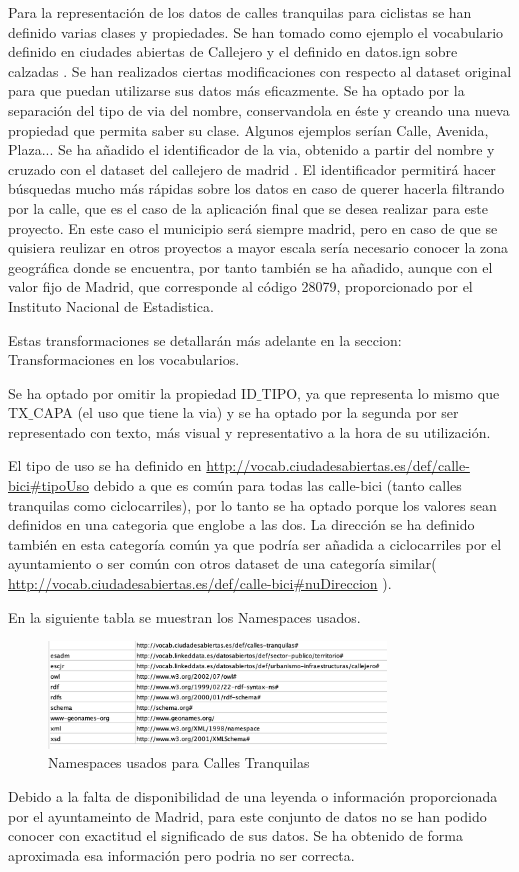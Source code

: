 Para la representación de los datos de calles tranquilas para ciclistas se han definido varias clases y propiedades. Se han tomado como ejemplo el vocabulario definido en ciudades abiertas de Callejero \cite{ciudadesbiertas_callejero} y el definido en datos.ign sobre calzadas \cite{datosIgnCalzada}.
\newline
Se han realizados ciertas modificaciones con respecto al dataset original para que puedan utilizarse sus datos más eficazmente.
Se ha optado por la separación del tipo de via del nombre, conservandola en éste y creando una nueva propiedad que permita saber su clase. Algunos ejemplos serían Calle, Avenida, Plaza...
Se ha añadido el identificador de la via, obtenido a partir del nombre y cruzado con el dataset del callejero de madrid \cite{datosmadrid_callejero}. El identificador permitirá hacer búsquedas mucho más rápidas sobre los datos en caso de querer hacerla filtrando por la calle, que es el caso de la aplicación final que se desea realizar para este proyecto.
En este caso el municipio será siempre madrid, pero en caso de que se quisiera reulizar en otros proyectos a mayor escala sería necesario conocer la zona geográfica donde se encuentra, por tanto también se ha añadido, aunque con el valor fijo de Madrid, que corresponde al código 28079, proporcionado por el Instituto Nacional de Estadistica\cite{datosIgnMunicipios}.

Estas transformaciones se detallarán más adelante en la seccion: Transformaciones en los vocabularios.

Se ha optado por omitir la propiedad ID$\_$TIPO, ya que representa lo mismo que TX$\_$CAPA (el uso que tiene la via) y se ha optado por la segunda por ser representado con texto, más visual y representativo a la hora de su utilización.

El tipo de uso se ha definido en \url{http://vocab.ciudadesabiertas.es/def/calle-bici#tipoUso} debido a que es común para todas las calle-bici (tanto calles tranquilas como ciclocarriles), por lo tanto se ha optado porque los valores sean definidos en una categoria que englobe a las dos.
La dirección se ha definido también en esta categoría común ya que podría ser añadida a ciclocarriles por el ayuntamiento o ser común con otros dataset de una categoría similar( \url{http://vocab.ciudadesabiertas.es/def/calle-bici#nuDireccion} ).

En la siguiente tabla se muestran los Namespaces usados.

\begin{figure}[h]
	\centering
		\includegraphics[angle=0, width=0.8\textwidth]{images/tablaIRIsCallesTranquilas.png}  
	\caption{Namespaces usados para Calles Tranquilas}
\end{figure}


Debido a la falta de disponibilidad de una leyenda o información proporcionada por el ayuntameinto de Madrid, para este conjunto de datos no se han podido conocer con exactitud el significado de sus datos. Se ha obtenido de forma aproximada esa información pero podria no ser correcta.


